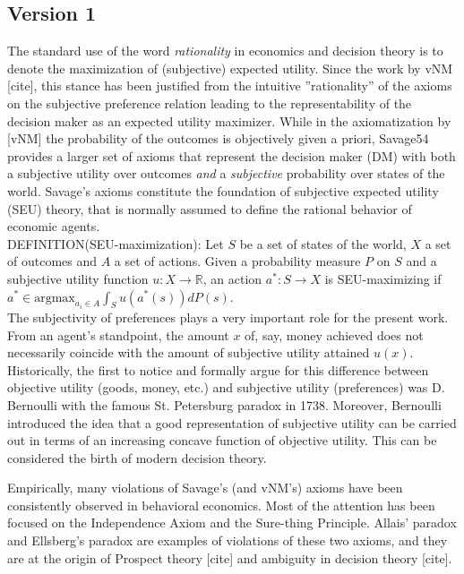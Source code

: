 \documentclass[fleqn,reqno,11pt]{article}
\begin{document}
\subsection{Version 1}

The standard use of the word \textit{rationality} in economics and decision theory is to denote the maximization of (subjective) expected utility. Since the work by vNM [cite], this stance has been justified from the intuitive ''rationality'' of the axioms on the subjective preference relation leading to the representability of the decision maker as an expected utility maximizer. 
While in the axiomatization by [vNM] the probability of the outcomes is objectively given a priori, Savage54 provides a larger set of axioms that represent the decision maker (DM) with both a subjective utility over outcomes \textit{and} a \textit{subjective} probability over states of the world. Savage's axioms constitute the foundation of subjective expected utility (SEU) theory, that is normally assumed to define the rational behavior of economic agents.\\

DEFINITION(SEU-maximization): Let $S$ be a set of states of the world, $X$ a set of outcomes and $A$ a set of actions. Given a probability measure $P$ on $S$ and a subjective utility function $u:X \rightarrow \mathbb{R} $, an action $a^*: S \rightarrow X $ is SEU-maximizing if $a^* \in \text{argmax}_{a_i \in A} \int_S u(a^*(s))dP(s) $. \\

The subjectivity of preferences plays a very important
role for the present work. From an agent's standpoint, the amount $x$ of, say, money achieved does not necessarily
coincide with the amount of subjective utility attained $u(x)$. 
Historically,  the first to notice and formally argue for this difference
between objective utility (goods, money, etc.) and subjective utility (preferences) was
D. Bernoulli with the famous St. Petersburg paradox in 1738. Moreover, Bernoulli introduced the idea that a good representation of
subjective utility can be carried out in terms of an increasing concave function of objective
utility. This can be considered the birth of modern decision theory.

Empirically, many violations of Savage's (and vNM's) axioms have been consistently observed in behavioral economics. Most of the attention has been focused on the Independence Axiom and the Sure-thing Principle. Allais' paradox and Ellsberg's paradox are examples of violations of these two axioms, and they are at the origin of Prospect theory [cite] and ambiguity in decision theory [cite].
\end{document}
